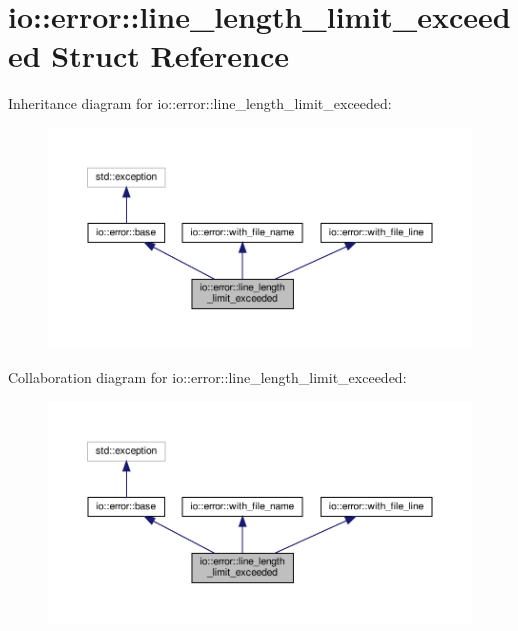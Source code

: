 \hypertarget{structio_1_1error_1_1line__length__limit__exceeded}{}\section{io\+:\+:error\+:\+:line\+\_\+length\+\_\+limit\+\_\+exceeded Struct Reference}
\label{structio_1_1error_1_1line__length__limit__exceeded}


Inheritance diagram for io\+:\+:error\+:\+:line\+\_\+length\+\_\+limit\+\_\+exceeded\+:\nopagebreak
\begin{figure}[H]
\begin{center}
\leavevmode
\includegraphics[width=350pt]{structio_1_1error_1_1line__length__limit__exceeded__inherit__graph}
\end{center}
\end{figure}


Collaboration diagram for io\+:\+:error\+:\+:line\+\_\+length\+\_\+limit\+\_\+exceeded\+:\nopagebreak
\begin{figure}[H]
\begin{center}
\leavevmode
\includegraphics[width=350pt]{structio_1_1error_1_1line__length__limit__exceeded__coll__graph}
\end{center}
\end{figure}
